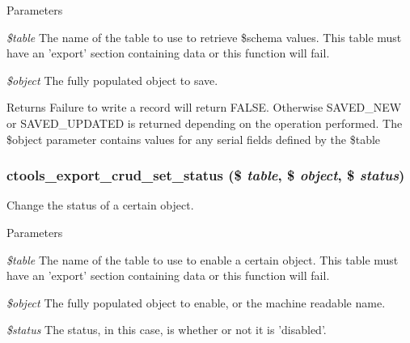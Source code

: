 \begin{DoxyParams}{Parameters}
\item[{\em \$table}]The name of the table to use to retrieve \$schema values. This table must have an 'export' section containing data or this function will fail. \item[{\em \$object}]The fully populated object to save.\end{DoxyParams}
\begin{DoxyReturn}{Returns}
Failure to write a record will return FALSE. Otherwise SAVED\_\-NEW or SAVED\_\-UPDATED is returned depending on the operation performed. The \$object parameter contains values for any serial fields defined by the \$table 
\end{DoxyReturn}
\hypertarget{group__export__crud_gabece68057272d59c9fcb6529bbd81211}{
\subsubsection[{ctools\_\-export\_\-crud\_\-set\_\-status}]{\setlength{\rightskip}{0pt plus 5cm}ctools\_\-export\_\-crud\_\-set\_\-status (\$ {\em table}, \/  \$ {\em object}, \/  \$ {\em status})}}
\label{group__export__crud_gabece68057272d59c9fcb6529bbd81211}
Change the status of a certain object.


\begin{DoxyParams}{Parameters}
\item[{\em \$table}]The name of the table to use to enable a certain object. This table must have an 'export' section containing data or this function will fail. \item[{\em \$object}]The fully populated object to enable, or the machine readable name. \item[{\em \$status}]The status, in this case, is whether or not it is 'disabled'. \end{DoxyParams}

